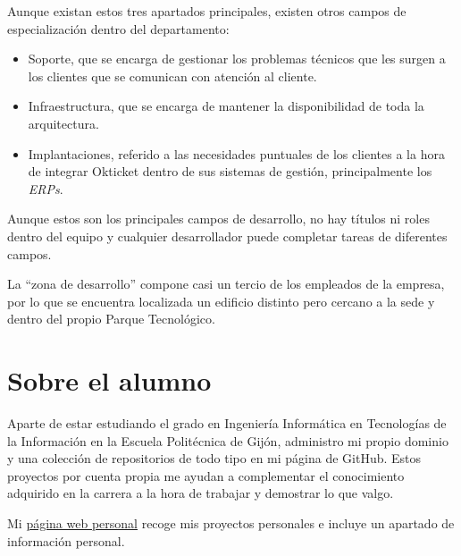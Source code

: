Aunque existan estos tres apartados principales, existen otros campos de especialización
dentro del departamento:
\begin{itemize}
	\item Soporte, que se encarga de gestionar los problemas técnicos que les surgen a los
		clientes que se comunican con atención al cliente.
	\item Infraestructura, que se encarga de mantener la disponibilidad de toda la arquitectura.
	\item Implantaciones, referido a las necesidades puntuales de los clientes a la
		hora de integrar Okticket dentro de sus sistemas de gestión, principalmente los \textit{ERPs}.
\end{itemize}

Aunque estos son los principales campos de desarrollo, no hay títulos ni roles dentro del
equipo y cualquier desarrollador puede completar tareas de diferentes campos.

La “zona de desarrollo” compone casi un tercio de los empleados de la empresa, por lo que se
encuentra localizada un edificio distinto pero cercano a la sede y dentro del propio Parque
Tecnológico.

\section{Sobre el alumno}
Aparte de estar estudiando el grado en Ingeniería Informática en Tecnologías de la Información
en la Escuela Politécnica de Gijón, administro mi propio dominio y una colección de
repositorios de todo tipo en mi página de GitHub. Estos proyectos por cuenta propia me ayudan
a complementar el conocimiento adquirido en la carrera a la hora de trabajar y demostrar lo que
valgo.

Mi \href{\target}{página web personal} recoge mis proyectos personales e incluye un apartado de información
personal.
